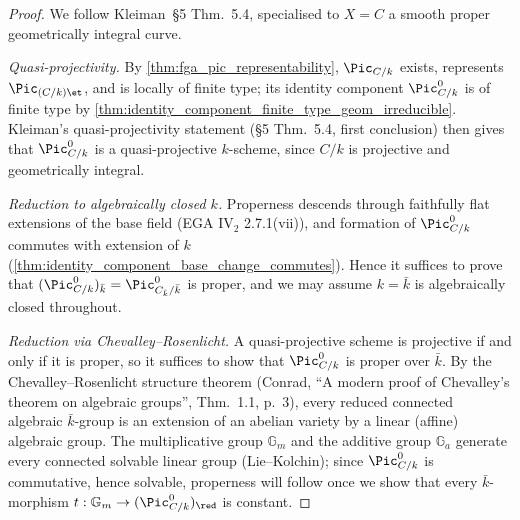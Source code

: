 \begin{proof}
  We follow Kleiman~\S 5 Thm.~5.4, specialised to \(X = C\) a
  smooth proper geometrically integral curve.

  \emph{Quasi-projectivity.} By
  \cref{thm:fga_pic_representability}, \(\Pic_{C/k}\) exists,
  represents \(\Pic_{(C/k)\et}\), and is locally of finite type; its
  identity component \(\Pic^0_{C/k}\) is of finite type by
  \cref{thm:identity_component_finite_type_geom_irreducible}.
  Kleiman's quasi-projectivity statement
  (\S 5 Thm.~5.4, first conclusion) then gives that
  \(\Pic^0_{C/k}\) is a quasi-projective \(k\)-scheme, since \(C/k\)
  is projective and geometrically integral.

  \emph{Reduction to algebraically closed \(k\).} Properness descends
  through faithfully flat extensions of the base field
  (EGA IV\(_2\) 2.7.1(vii)), and formation of \(\Pic^0_{C/k}\)
  commutes with extension of \(k\)
  (\cref{thm:identity_component_base_change_commutes}). Hence it
  suffices to prove that \((\Pic^0_{C/k})_{\bar k} =
  \Pic^0_{C_{\bar k}/\bar k}\) is proper, and we may assume
  \(k = \bar k\) is algebraically closed throughout.

  \emph{Reduction via Chevalley--Rosenlicht.} A quasi-projective
  scheme is projective if and only if it is proper, so it suffices to
  show that \(\Pic^0_{C/k}\) is proper over \(\bar k\). By the
  Chevalley--Rosenlicht structure theorem (Conrad, ``A modern proof of
  Chevalley's theorem on algebraic groups'', Thm.~1.1, p.~3), every
  reduced connected algebraic \(\bar k\)-group is an extension of an
  abelian variety by a linear (affine) algebraic group. The
  multiplicative group \(\mathbb{G}_m\) and the additive group
  \(\mathbb{G}_a\) generate every connected solvable linear group
  (Lie--Kolchin); since \(\Pic^0_{C/k}\) is commutative, hence
  solvable, properness will follow once we show that every
  \(\bar k\)-morphism \(t : \mathbb{G}_m \to (\Pic^0_{C/k})_{\red}\)
  is constant.


\end{proof}
